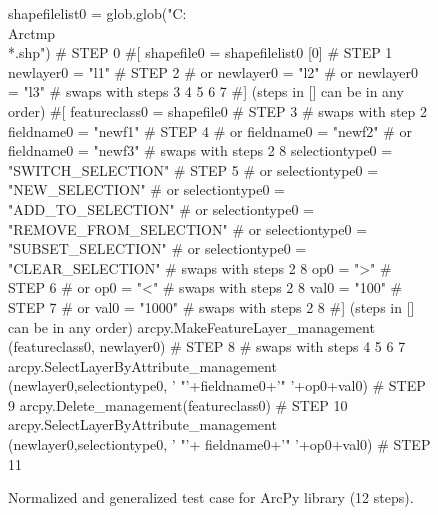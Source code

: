 \begin{figure}
{\scriptsize 
\begin{code}
shapefilelist0 = 
   glob.glob("C:\\Arctmp\\*.shp")        \textcolor{black!60}{\# STEP 0}
\textcolor{black!60}{\#[}
shapefile0 = shapefilelist0 [0]        \textcolor{black!60}{\# STEP 1}
newlayer0 = "l1"                       \textcolor{black!60}{\# STEP 2}
\textcolor{black!60}{\#  or newlayer0 = "l2" }
\textcolor{black!60}{\#  or newlayer0 = "l3" }
\textcolor{black!60}{\#  swaps with steps 3 4 5 6 7}
\textcolor{black!60}{\#] (steps in [] can be in any order)}
\textcolor{black!60}{\#[}
featureclass0 = shapefile0             \textcolor{black!60}{\# STEP 3}
\textcolor{black!60}{\#  swaps with step 2}
fieldname0 = "newf1"                   \textcolor{black!60}{\# STEP 4}
\textcolor{black!60}{\#  or fieldname0 = "newf2" }
\textcolor{black!60}{\#  or fieldname0 = "newf3" }
\textcolor{black!60}{\#  swaps with steps 2 8}
selectiontype0 = "SWITCH\_SELECTION"    \textcolor{black!60}{\# STEP 5}
\textcolor{black!60}{\#  or selectiontype0 = "NEW\_SELECTION" }
\textcolor{black!60}{\#  or selectiontype0 = "ADD\_TO\_SELECTION" }
\textcolor{black!60}{\#  or selectiontype0 = "REMOVE\_FROM\_SELECTION"}
\textcolor{black!60}{\#  or selectiontype0 = "SUBSET\_SELECTION"}
\textcolor{black!60}{\#  or selectiontype0 = "CLEAR\_SELECTION"   }
\textcolor{black!60}{\#  swaps with steps 2 8}
op0 = ">"                              \textcolor{black!60}{\# STEP 6}
\textcolor{black!60}{\#  or op0 = "<" }
\textcolor{black!60}{\#  swaps with steps 2 8}
val0 = "100"                           \textcolor{black!60}{\# STEP 7}
\textcolor{black!60}{\#  or val0 = "1000" }
\textcolor{black!60}{\#  swaps with steps 2 8}
\textcolor{black!60}{\#] (steps in [] can be in any order)}
arcpy.MakeFeatureLayer\_management
   (featureclass0, newlayer0)          \textcolor{black!60}{\# STEP 8}
\textcolor{black!60}{\#  swaps with steps 4 5 6 7}
arcpy.SelectLayerByAttribute\_management
   (newlayer0,selectiontype0,
   ' "'+fieldname0+'" '+op0+val0)      \textcolor{black!60}{\# STEP 9}
arcpy.Delete\_management(featureclass0) \textcolor{black!60}{\# STEP 10}
arcpy.SelectLayerByAttribute\_management
   (newlayer0,selectiontype0,
   ' "'+ fieldname0+'" '+op0+val0)     \textcolor{black!60}{\# STEP 11}
\end{code}
}
\caption{Normalized and generalized test case for ArcPy library
  (12 steps).}
\label{esrinormgen}
\end{figure}